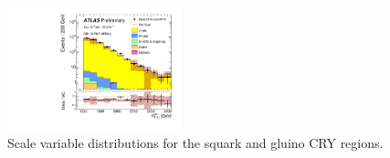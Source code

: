 \begin{figure}[tbp]
\begin{center}
\includegraphics[width=0.45\textwidth]{figures/ATLAS-CONF-2016-078_INT/N-1Plots/AtlasStyle/Preliminary/CRY_SRJigsawSRS3a_LastCut_CRY_minusone}
\end{center}
\caption{Scale variable distributions for the squark and gluino CRY regions.}
\label{fig:CRY_SRJigsawSRG1a_LastCut_CRY_minusone}
\end{figure}

\clearpage

